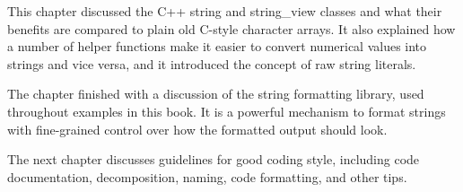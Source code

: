 This chapter discussed the C++ string and string\_view classes and what their benefits are compared to plain old C-style character arrays. It also explained how a number of helper functions make it easier to convert numerical values into strings and vice versa, and it introduced the concept of raw string literals.

The chapter finished with a discussion of the string formatting library, used throughout examples in this book. It is a powerful mechanism to format strings with fine-grained control over how the formatted output should look.

The next chapter discusses guidelines for good coding style, including code documentation, decomposition, naming, code formatting, and other tips.